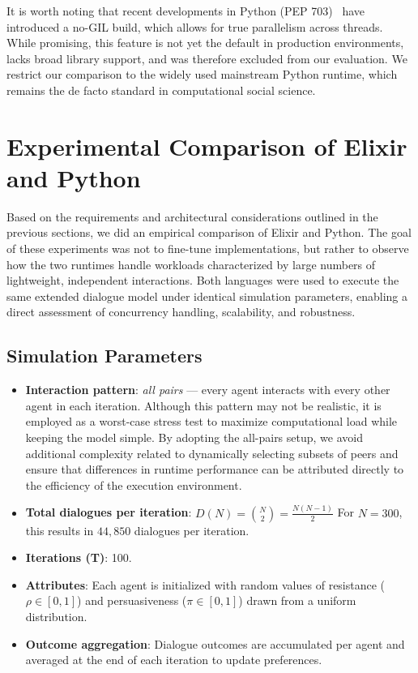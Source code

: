 \documentclass[
]{ceurart}
\begin{document}
It is worth noting that recent developments in Python (PEP 703)~\cite{pep703} have introduced a no-GIL build, which allows for true parallelism across threads. While promising, this feature is not yet the default in production environments, lacks broad library support, and was therefore excluded from our evaluation. We restrict our comparison to the widely used mainstream Python runtime, which remains the de facto standard in computational social science.



\section{Experimental Comparison of Elixir and Python}
Based on the requirements and architectural considerations outlined in the previous sections, we did an empirical comparison of Elixir and Python. The goal of these experiments was not to fine-tune implementations, but rather to observe how the two runtimes handle workloads characterized by large numbers of lightweight, independent interactions. Both languages were used to execute the same extended dialogue model under identical simulation parameters, enabling a direct assessment of concurrency handling, scalability, and robustness.

\subsection{Simulation Parameters}
\begin{itemize}
	\item \textbf{Interaction pattern}: \emph{all pairs} — every agent interacts with every other agent in each iteration. Although this pattern may not be realistic, it is employed as a worst-case stress test to maximize computational load while keeping the model simple. By adopting the all-pairs setup, we avoid additional complexity related to dynamically selecting subsets of peers and ensure that differences in runtime performance can be attributed directly to the efficiency of the execution environment.

	\item \textbf{Total dialogues per iteration}:
$D(N) = \binom{N}{2} = \frac{N(N-1)}{2}$
For $N = 300$, this results in $44{,}850$ dialogues per iteration.
	\item \textbf{Iterations (T)}: 100.
	\item \textbf{Attributes}: Each agent is initialized with random values of resistance ($\rho \in [0,1]$) and persuasiveness ($\pi \in [0,1]$) drawn from a uniform distribution.
	\item \textbf{Outcome aggregation}: Dialogue outcomes are accumulated per agent and averaged at the end of each iteration to update preferences.
\end{itemize}
\end{document}
